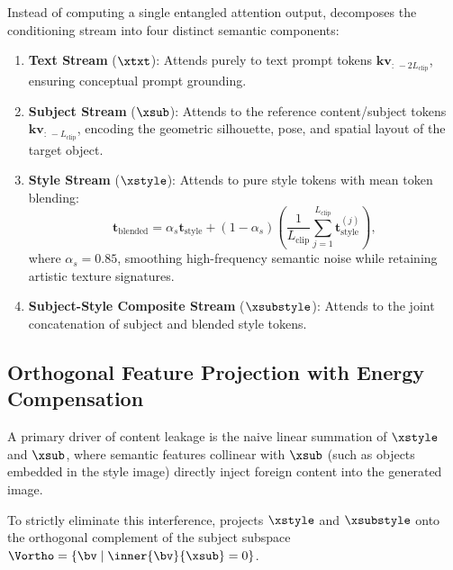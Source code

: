 Instead of computing a single entangled attention output, \method decomposes the conditioning stream into four distinct semantic components:
\begin{enumerate}
    \item \textbf{Text Stream} ($\xtxt$): Attends purely to text prompt tokens $\mathbf{kv}_{:\,-2L_{\text{clip}}}$, ensuring conceptual prompt grounding.
    \item \textbf{Subject Stream} ($\xsub$): Attends to the reference content/subject tokens $\mathbf{kv}_{:\,-L_{\text{clip}}}$, encoding the geometric silhouette, pose, and spatial layout of the target object.
    \item \textbf{Style Stream} ($\xstyle$): Attends to pure style tokens with mean token blending:
    \begin{equation}
        \mathbf{t}_{\text{blended}} = \alpha_s \mathbf{t}_{\text{style}} + (1 - \alpha_s) \left( \frac{1}{L_{\text{clip}}} \sum_{j=1}^{L_{\text{clip}}} \mathbf{t}_{\text{style}}^{(j)} \right),
    \end{equation}
    where $\alpha_s = 0.85$, smoothing high-frequency semantic noise while retaining artistic texture signatures.
    \item \textbf{Subject-Style Composite Stream} ($\xsubstyle$): Attends to the joint concatenation of subject and blended style tokens.
\end{enumerate}

\subsection{Orthogonal Feature Projection with Energy Compensation}
\label{subsec:ortho_proj}
A primary driver of content leakage is the naive linear summation of $\xstyle$ and $\xsub$, where semantic features collinear with $\xsub$ (such as objects embedded in the style image) directly inject foreign content into the generated image.

To strictly eliminate this interference, \method projects $\xstyle$ and $\xsubstyle$ onto the orthogonal complement of the subject subspace $\Vortho = \{ \bv \mid \inner{\bv}{\xsub} = 0 \}$.

